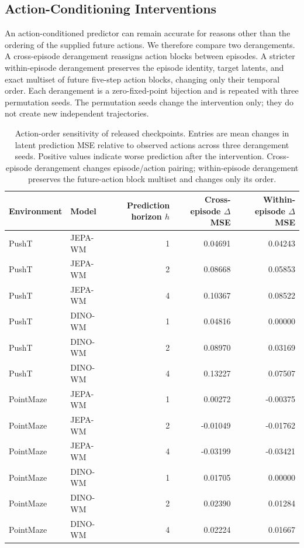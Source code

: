 \documentclass{article}
\begin{document}
\subsection{Action-Conditioning Interventions}
\label{sec:supp-action-interventions}

An action-conditioned predictor can remain accurate for reasons other than the
ordering of the supplied future actions. We therefore compare two derangements.
A cross-episode derangement
reassigns action blocks between episodes. A stricter within-episode
derangement preserves the episode identity, target latents, and exact multiset
of future five-step action blocks, changing only their temporal order. Each
derangement is a zero-fixed-point bijection and is repeated with three
permutation seeds. The permutation seeds change the intervention only; they do
not create new independent trajectories.

\begin{table}[H]
\centering
\small
\setlength{\tabcolsep}{4pt}
\caption{Action-order sensitivity of released checkpoints. Entries
are mean changes in latent prediction MSE relative to observed actions across
three derangement seeds. Positive values indicate worse prediction after the
intervention. Cross-episode derangement changes episode/action pairing;
within-episode derangement preserves the future-action block multiset and
changes only its order.}
\label{tab:supp-action-interventions}
\begin{tabular}{llrrr}
\toprule
Environment & Model & Prediction horizon $h$ & Cross-episode $\Delta$MSE & Within-episode $\Delta$MSE \\
\midrule
PushT & JEPA-WM & 1 & 0.04691 & 0.04243 \\
PushT & JEPA-WM & 2 & 0.08668 & 0.05853 \\
PushT & JEPA-WM & 4 & 0.10367 & 0.08522 \\
PushT & DINO-WM & 1 & 0.04816 & 0.00000 \\
PushT & DINO-WM & 2 & 0.08970 & 0.03169 \\
PushT & DINO-WM & 4 & 0.13227 & 0.07507 \\
\midrule
PointMaze & JEPA-WM & 1 & 0.00272 & -0.00375 \\
PointMaze & JEPA-WM & 2 & -0.01049 & -0.01762 \\
PointMaze & JEPA-WM & 4 & -0.03199 & -0.03421 \\
PointMaze & DINO-WM & 1 & 0.01705 & 0.00000 \\
PointMaze & DINO-WM & 2 & 0.02390 & 0.01284 \\
PointMaze & DINO-WM & 4 & 0.02224 & 0.01667 \\
\bottomrule
\end{tabular}
\end{table}
\end{document}

